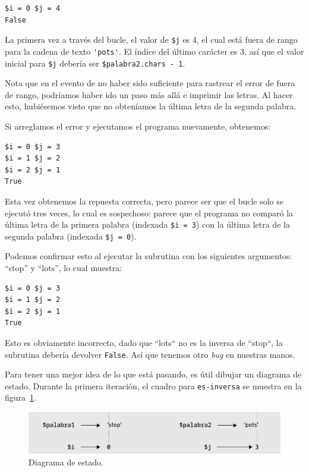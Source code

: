 \begin{verbatim}
$i = 0 $j = 4
False
\end{verbatim}
%
La primera vez a través del bucle, el valor de {\tt \$j} es 4,
el cual está fuera de rango para la cadena de texto \verb|'pots'|.
El índice del último carácter es 3,  así que el valor inicial para
{\tt \$j} debería ser {\tt \$palabra2.chars - 1}.

Nota que en el evento de no haber sido suficiente para rastrear 
el error de fuera de rango, podríamos haber ido un paso más allá
e imprimir las letras. Al hacer esto, hubiésemos visto que no
obteníamos la última letra de la segunda palabra.

Si arreglamos el error y ejecutamos el programa nuevamente,
obtenemos:

\begin{verbatim}
$i = 0 $j = 3
$i = 1 $j = 2
$i = 2 $j = 1
True
\end{verbatim}
%
Esta vez obtenemos la repuesta correcta, pero parece ser
que el bucle solo se ejecutó tres veces, lo cual es sospechoso:
parece que el programa no comparó la última letra de la 
primera palabra (indexada {\tt \$i = 3}) con la última letra de
la segunda palabra (indexada {\tt \$j = 0}).

Podemos confirmar esto al ejecutar la subrutina con los siguientes
argumentos: ``stop'' y ``lots'', lo cual muestra:

\begin{verbatim}
$i = 0 $j = 3
$i = 1 $j = 2
$i = 2 $j = 1
True
\end{verbatim}
%

Esto es obviamente incorrecto, dado que ``lots`` no es la inversa de
``stop``, la subrutina debería devolver {\tt False}. Así que tenemos
otro \emph{bug} en nuestras manos.

Para tener una mejor idea de lo que está pasando, es útil dibujar 
un diagrama de estado. Durante la primera iteración, el cuadro para
\verb|es-inversa| se muestra en la figura~\ref{fig.state4}. 
 

\begin{figure}
\centerline
{\includegraphics[scale=0.5]{figs/state6.pdf}}
\caption{Diagrama de estado.}
\label{fig.state4}
\end{figure}

